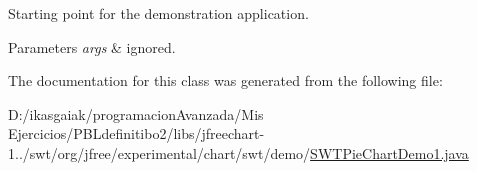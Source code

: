 Starting point for the demonstration application.


\begin{DoxyParams}{Parameters}
{\em args} & ignored. \\
\hline
\end{DoxyParams}


The documentation for this class was generated from the following file\+:\begin{DoxyCompactItemize}
\item 
D\+:/ikasgaiak/programacion\+Avanzada/\+Mis Ejercicios/\+P\+B\+Ldefinitibo2/libs/jfreechart-\/1../swt/org/jfree/experimental/chart/swt/demo/\mbox{\hyperlink{_s_w_t_pie_chart_demo1_8java}{S\+W\+T\+Pie\+Chart\+Demo1.\+java}}\end{DoxyCompactItemize}
